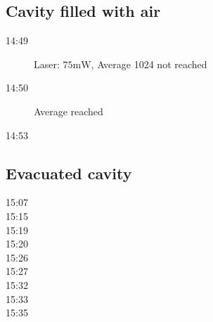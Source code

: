 \documentclass[
	parskip=half,10pt,
	numbers= noenddot, %
	toc=flat, %
	oneside,
	twocolumn,
	]{scrartcl}
\begin{document}
\subsection*{Cavity filled with air}
\begin{description}
\item[14:49] Laser: $75\si{\milli \watt}$, Average 1024 not reached
\item[14:50] Average reached
\item[14:53]
\end{description}
\subsection*{Evacuated cavity}
\begin{description}
\item[15:07]
\item[15:15]
\item[15:19]
\item[15:20]
\item[15:26]
\item[15:27]
\item[15:32]
\item[15:33]
\item[15:35]
\end{description}
\newpage


\end{document}
